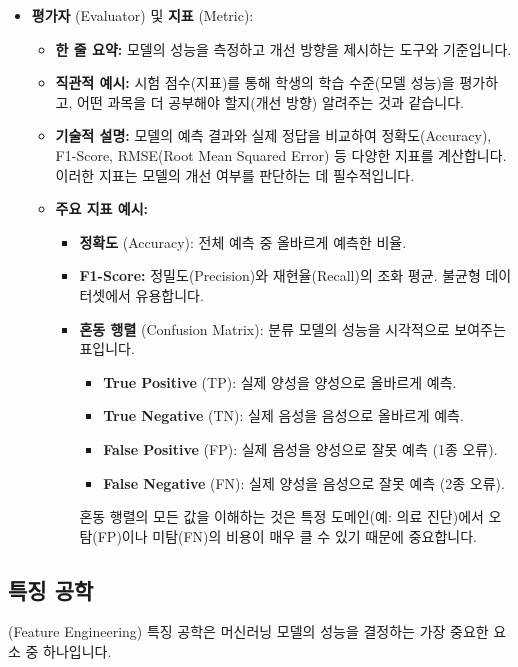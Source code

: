 \documentclass[11pt,a4paper]{article}
\theoremstyle{definition}
\begin{document}
\begin{itemize}
\begin{itemize}
    \end{itemize}
    \item \textbf{평가자} (Evaluator) 및 \textbf{지표} (Metric):
    \begin{itemize}
        \item \textbf{한 줄 요약:} 모델의 성능을 측정하고 개선 방향을 제시하는 도구와 기준입니다.
        \item \textbf{직관적 예시:} 시험 점수(지표)를 통해 학생의 학습 수준(모델 성능)을 평가하고, 어떤 과목을 더 공부해야 할지(개선 방향) 알려주는 것과 같습니다.
        \item \textbf{기술적 설명:} 모델의 예측 결과와 실제 정답을 비교하여 정확도(Accuracy), F1-Score, RMSE(Root Mean Squared Error) 등 다양한 지표를 계산합니다. 이러한 지표는 모델의 개선 여부를 판단하는 데 필수적입니다.
        \item \textbf{주요 지표 예시:}
        \begin{itemize}
            \item \textbf{정확도} (Accuracy): 전체 예측 중 올바르게 예측한 비율.
            \item \textbf{F1-Score:} 정밀도(Precision)와 재현율(Recall)의 조화 평균. 불균형 데이터셋에서 유용합니다.
            \item \textbf{혼동 행렬} (Confusion Matrix): 분류 모델의 성능을 시각적으로 보여주는 표입니다.
            \begin{itemize}
                \item \textbf{True Positive} (TP): 실제 양성을 양성으로 올바르게 예측.
                \item \textbf{True Negative} (TN): 실제 음성을 음성으로 올바르게 예측.
                \item \textbf{False Positive} (FP): 실제 음성을 양성으로 잘못 예측 (1종 오류).
                \item \textbf{False Negative} (FN): 실제 양성을 음성으로 잘못 예측 (2종 오류).
            \end{itemize}
            혼동 행렬의 모든 값을 이해하는 것은 특정 도메인(예: 의료 진단)에서 오탐(FP)이나 미탐(FN)의 비용이 매우 클 수 있기 때문에 중요합니다.
        \end{itemize}
    \end{itemize}
\end{itemize}

\subsection*{특징 공학} (Feature Engineering)
특징 공학은 머신러닝 모델의 성능을 결정하는 가장 중요한 요소 중 하나입니다.
\end{document}
